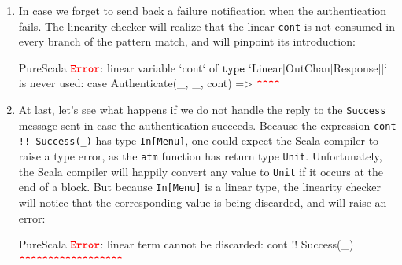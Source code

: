\documentclass[a4paper,twoside]{article}
\newcommand{\stt}[1]{\texttt{\small{#1}}}
\begin{document}
\begin{enumerate}
\begin{enumerate}
Re-using the same channel twice would also give rise to an error:

\begin{ShortCode}{PureScala}
$\texttt{\textbf{\textcolor{Red}{Error}}}$: linear term `cont` has already been used: doSomething(cont)
                               $\texttt{\textbf{\textcolor{Red}{\textasciicircum\textasciicircum\textasciicircum\textasciicircum}}}$
$\texttt{\textbf{\textcolor{Blue}{Info}}}$: term used here: cont !! Balance(balance(card))(_) ? menu(card)
                                                            $\texttt{\textbf{\textcolor{Red}{\textasciicircum\textasciicircum\textasciicircum\textasciicircum}}}$
\end{ShortCode}

\item
In case we forget to send back a failure notification when the authentication fails. The linearity checker will realize that the linear \stt{cont} is not consumed in every branch of the pattern match, and will pinpoint its introduction:

\begin{ShortCode}{PureScala}
$\texttt{\textbf{\textcolor{Red}{Error}}}$: linear variable `cont` of $\texttt{type}$ `Linear[OutChan[Response]]` is never used:
                 case Authenticate(_, _, cont) =>
                                         $\texttt{\textbf{\textcolor{Red}{\textasciicircum\textasciicircum\textasciicircum\textasciicircum}}}$
\end{ShortCode}

\item
At last, let's see what happens if we do not handle the reply to the \stt{Success} message sent in case the authentication succeeds. Because the expression \stt{cont !! Success(\_)} has type \stt{In[Menu]}, one could expect the Scala compiler to raise a type error, as the \stt{atm} function has return type \stt{Unit}. Unfortunately, the Scala compiler will happily convert any value to \stt{Unit} if it occurs at the end of a block. But because \stt{In[Menu]} is a linear type, the linearity checker will notice that the corresponding value is being discarded, and will raise an error:

\begin{ShortCode}{PureScala}
$\texttt{\textbf{\textcolor{Red}{Error}}}$: linear term cannot be discarded: cont !! Success(_)
                                        $\texttt{\textbf{\textcolor{Red}{\textasciicircum\textasciicircum\textasciicircum\textasciicircum\textasciicircum\textasciicircum\textasciicircum\textasciicircum\textasciicircum\textasciicircum\textasciicircum\textasciicircum\textasciicircum\textasciicircum\textasciicircum\textasciicircum\textasciicircum\textasciicircum}}}$
\end{ShortCode}
\end{enumerate}


\end{enumerate}
\end{document}
